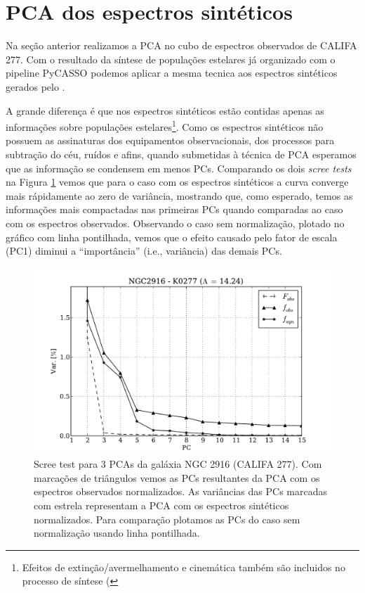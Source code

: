 \section{PCA dos espectros sintéticos}
\label{sec:PCAaplic:OBSxSYN}

Na seção anterior realizamos a PCA no cubo de espectros observados de CALIFA 277. Com o resultado da síntese de
populações estelares já organizado com o pipeline PyCASSO podemos aplicar a mesma tecnica aos espectros sintéticos
gerados pelo \starlight.

A grande diferença é que nos espectros sintéticos estão contidas apenas as informações sobre populações
estelares\footnote{Efeitos de extinção/avermelhamento e cinemática também são incluidos no processo de síntese
(\citep{CidFernandes2005}}. Como os espectros sintéticos não possuem as assinaturas dos equipamentos observacionais, dos
processos para subtração do céu, ruídos e afins, quando submetidas à técnica de PCA esperamos que as informação se
condensem em menos PCs. Comparando os dois {\em scree tests} na Figura \ref{fig:K0277scree} vemos que para o caso com os
espectros sintéticos a curva converge mais rápidamente ao zero de variância, mostrando que, como esperado, temos as
informações mais compactadas nas primeiras PCs quando comparadas ao caso com os espectros observados. Observando o caso
sem normalização, plotado no gráfico com linha pontilhada, vemos que o efeito causado pelo fator de escala (PC1) diminui
a ``importância'' (i.e., variância) das demais PCs.

\begin{figure}
    \includegraphics[width=1.\textwidth]{figuras/K0277-screetest.pdf}
    \caption[Scree test comparativo entre 3 PCAs.]
    {Scree test para 3 PCAs da galáxia NGC 2916 (CALIFA 277). Com marcações de triângulos vemos as PCs resultantes
    da PCA com os espectros observados normalizados. As variâncias das PCs marcadas com estrela representam a PCA com
    os espectros sintéticos normalizados. Para comparação plotamos as PCs do caso sem normalização usando linha pontilhada.}
    \label{fig:K0277scree}
\end{figure}

